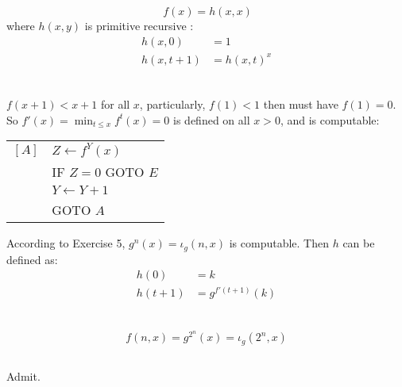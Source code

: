 \subsection{}
\[\ f(x) = h(x, x) \]
where $h(x,y)$ is primitive recursive :
\begin{align*}
  h(x, 0)   & = 1 \\
  h(x, t+1) & = {h(x, t)}^{x} \\
\end{align*}


\subsection{}
$ f(x+1) < x+1 $ for all $x$, particularly, $ f(1) < 1 $ then must have
 $ f(1) = 0 $. So $ f'(x) = \min _{t\le x} f^{t}(x) = 0 $ is defined on 
all $ x>0 $, and is computable:
\begin{center}
\begin{tabular}{ll}
  $[A]$ & $ Z \gets f^{Y}(x) $ \\
        & IF $Z = 0$ GOTO $E$ \\
        & $ Y \gets Y + 1 $ \\
        & GOTO $A$
\end{tabular}
\end{center}
According to Exercise 5, $ g^{n}(x) = \iota_{g}(n, x) $ is computable.
Then $h$ can be defined as:
\begin{align*}
  h(0)   & = k \\
  h(t+1) & = g^{f'(t+1)}(k) \\
\end{align*}


\subsection{}
\[ f(n, x) = g^{2^{n}}(x) = \iota_{g}(2^{n}, x) \]

\subsection{}
Admit.

